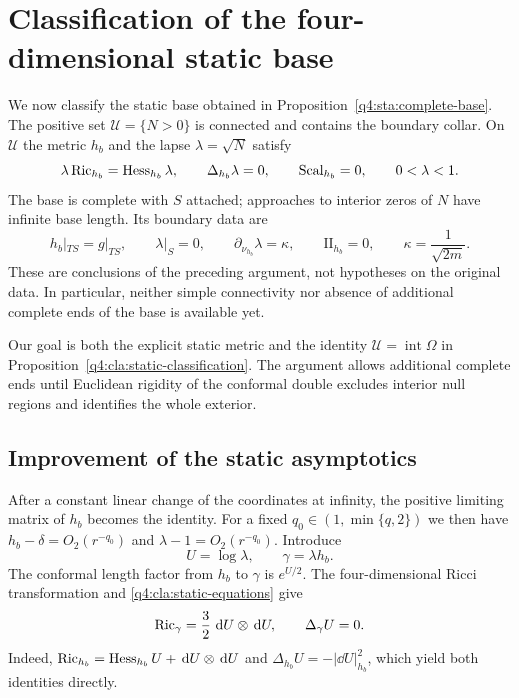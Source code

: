 \section{Classification of the four-dimensional static base}
\label{q4:cla:section}

We now classify the static base obtained in
Proposition~\ref{q4:sta:complete-base}.  The positive set $\mathcal U=\{N>0\}$
is connected and contains the boundary collar.  On $\mathcal U$ the metric
$h_b$ and the lapse $\lambda=\sqrt N$ satisfy
\begin{equation}\label{q4:cla:static-equations}
 \lambda\operatorname{Ric}_{h_b}=\operatorname{Hess}_{h_b}\lambda,
 \qquad \Delta_{h_b}\lambda=0,
 \qquad \operatorname{Scal}_{h_b}=0,
 \qquad 0<\lambda<1.
\end{equation}
The base is complete with $S$ attached; approaches to interior zeros of $N$
have infinite base length.  Its boundary data are
\begin{equation}\label{q4:cla:boundary-data}
 h_b|_{TS}=g|_{TS},\qquad
 \lambda|_S=0,\qquad
 \partial_{\nu_{h_b}}\lambda=\kappa,\qquad
 \mathrm{II}_{h_b}=0,
 \qquad \kappa=\frac1{\sqrt{2m}}.
\end{equation}
These are conclusions of the preceding argument, not hypotheses on the
original data.  In particular, neither simple connectivity nor absence
of additional complete ends of the base is available yet.

Our goal is both the explicit static metric and the identity
$\mathcal U=\operatorname{int}\Omega$ in
Proposition~\ref{q4:cla:static-classification}.  The argument allows additional
complete ends until Euclidean rigidity of the conformal double excludes
interior null regions and identifies the whole exterior.

\subsection{Improvement of the static asymptotics}

After a constant linear change of the coordinates at infinity, the
positive limiting matrix of $h_b$ becomes the identity.  For a fixed
$q_0\in(1,\min\{q,2\})$ we then have
$h_b-\delta=O_2(r^{-q_0})$ and
$\lambda-1=O_2(r^{-q_0})$.  Introduce
\begin{equation}\label{q4:cla:reduced-variables}
 U=\log\lambda,\qquad \gamma=\lambda h_b.
\end{equation}
The conformal length factor from $h_b$ to $\gamma$ is $e^{U/2}$.
The four-dimensional Ricci transformation and
\eqref{q4:cla:static-equations} give
\begin{equation}\label{q4:cla:reduced-equations}
 \operatorname{Ric}_\gamma=\frac32\,\,\mathrm d U\otimes\,\mathrm d U,
 \qquad \Delta_\gamma U=0.
\end{equation}
Indeed,
$\operatorname{Ric}_{h_b}=\operatorname{Hess}_{h_b}U+\,\mathrm d U\otimes\,\mathrm d U$ and
$\Delta_{h_b}U=-|\dd U|_{h_b}^2$, which yield both identities directly.

